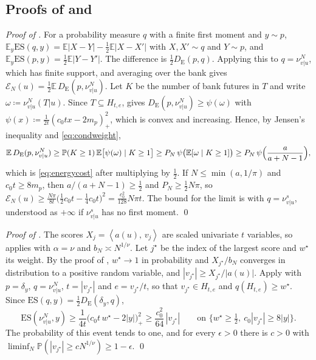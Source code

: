 \documentclass[11pt]{article}
\theoremstyle{plain}
\theoremstyle{definition}
\theoremstyle{remark}
\newcommand{\E}{\mathbb{E}}
\newcommand{\define}{\coloneqq}
\newcommand{\DE}{D_{\mathrm{E}}}
\newcommand{\IP}[2]{\left\langle #1,\, #2 \right\rangle}
\newcommand{\abs}[1]{\left\lvert #1 \right\rvert}
\begin{document}
\subsection{Proofs of \texorpdfstring{}{Theorem 4.23} and \texorpdfstring{}{Corollary 4.24}}
\label{app:energycost}
\emph{Proof of .}
For a probability measure $q$ with a finite first moment and $y\sim p$,
$\E_y\mathrm{ES}(q,y)=\E\abs{X-Y}-\tfrac12\E\abs{X-X'}$ with $X,X'\sim q$ and
$Y\sim p$, and $\E_y\mathrm{ES}(p,y)=\tfrac12\E\abs{Y-Y'}$. The difference is
$\tfrac12\DE(p,q)$. Applying this to $q=\nu^{N}_{v\vert u}$, which has finite
support, and averaging over the bank gives
$\mathcal{E}_N(u)=\tfrac12\E\,\DE(p,\nu^{N}_{v\vert u})$. Let $K$ be the
number of bank futures in $T$ and write $\omega\define\nu^{N}_{v\vert u}(T\vert u)$.
Since $T\subseteq H_{t,e}$,  gives
$\DE(p,\nu^{N}_{v\vert u})\ge\psi(\omega)$ with
$\psi(x)\define\frac{1}{2t}(c_0tx-2m_p)_{+}^{2}$, which is convex and
increasing. Hence, by Jensen's inequality and \eqref{eq:condweight},
\begin{equation*}
 \E\,\DE(p,\nu^{N}_{v\vert u})\ge\mathbb{P}(K\ge1)\,\E\bigl[\psi(\omega)\mid K\ge1\bigr]
 \ge P_N\,\psi\bigl(\E[\omega\mid K\ge1]\bigr)\ge P_N\,\psi\Bigl(\frac{a}{a+N-1}\Bigr),
\end{equation*}
which is \eqref{eq:energycost} after multiplying by $\tfrac12$. If
$N\le\min(a,1/\pi)$ and $c_0t\ge8m_p$, then $a/(a+N-1)\ge\tfrac12$ and
$P_N\ge\tfrac12N\pi$, so
$\mathcal{E}_N(u)\ge\frac{N\pi}{8t}\bigl(\tfrac12c_0t-\tfrac14c_0t\bigr)^{2}=\frac{c_0^{2}}{128}N\pi t$.
The bound for the limit is  with $q=\nu^{s}_{v\vert u}$,
understood as $+\infty$ if $\nu^{s}_{v\vert u}$ has no first moment.
\qed

\smallskip
\noindent\emph{Proof of .}
The scores $X_j=\IP{a(u)}{v_j}$ are scaled univariate $t$ variables, so
 applies with $\alpha=\nu$ and $b_N\asymp N^{1/\nu}$. Let
$j^{\star}$ be the index of the largest score and $w^{\star}$ its weight. By
the proof of , $w^{\star}\to1$ in probability and
$X_{j^{\star}}/b_N$ converges in distribution to a positive random variable,
and $\abs{v_{j^{\star}}}\ge X_{j^{\star}}/\abs{a(u)}$. Apply
 with $p=\delta_y$, $q=\nu^{N}_{v\vert u}$,
$t=\abs{v_{j^{\star}}}$ and $e=v_{j^{\star}}/t$, so that $v_{j^{\star}}\in H_{t,e}$
and $q(H_{t,e})\ge w^{\star}$. Since
$\mathrm{ES}(q,y)=\tfrac12\DE(\delta_y,q)$,
\begin{equation*}
 \mathrm{ES}(\nu^{N}_{v\vert u},y)\ge\frac{1}{4t}\bigl(c_0t\,w^{\star}-2\abs{y}\bigr)_{+}^{2}
 \ge\frac{c_0^{2}}{64}\,\abs{v_{j^{\star}}}
 \qquad\text{on }\bigl\{w^{\star}\ge\tfrac12,\ c_0\abs{v_{j^{\star}}}\ge8\abs{y}\bigr\}.
\end{equation*}
The probability of this event tends to one, and for every $\epsilon>0$ there
is $c>0$ with $\liminf_N\mathbb{P}(\abs{v_{j^{\star}}}\ge cN^{1/\nu})\ge1-\epsilon$.
\qed
\end{document}
